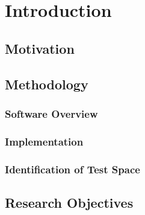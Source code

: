 \chapter{Introduction}

\section{Motivation}
\section{Methodology}
\subsection{Software Overview}
\subsection{Implementation}
\subsection{Identification of Test Space}
\section{Research Objectives}



